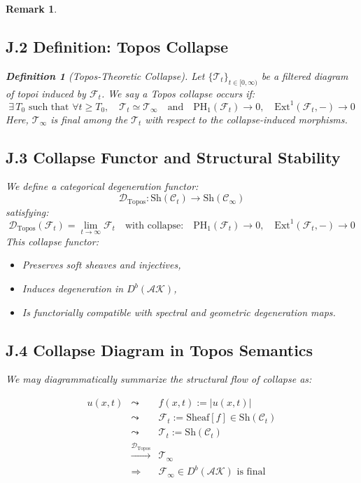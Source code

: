 \documentclass[11pt]{article}
\newtheorem{definition}[theorem]{Definition}
\newtheorem{remark}[theorem]{Remark}
\begin{document}
\begin{remark}
\subsection*{J.2 Definition: Topos Collapse}

\begin{definition}[Topos-Theoretic Collapse]
Let $\{\mathscr{T}_t\}_{t\in[0,\infty)}$ be a filtered diagram of topoi induced by $\mathcal{F}_t$.  
We say a \emph{Topos collapse} occurs if:
\[
\exists\, T_0 \text{ such that } \forall t \geq T_0,\quad \mathscr{T}_t \simeq \mathscr{T}_\infty
\quad \text{and} \quad \mathrm{PH}_1(\mathcal{F}_t) \to 0,\quad \mathrm{Ext}^1(\mathcal{F}_t, -) \to 0
\]
Here, $\mathscr{T}_\infty$ is final among the $\mathscr{T}_t$ with respect to the collapse-induced morphisms.
\end{definition}

\subsection*{J.3 Collapse Functor and Structural Stability}

We define a categorical degeneration functor:
\[
\mathcal{D}_\mathrm{Topos} : \mathrm{Sh}(\mathcal{C}_t) \longrightarrow \mathrm{Sh}(\mathcal{C}_\infty)
\]
satisfying:
\[
\mathcal{D}_\mathrm{Topos}(\mathcal{F}_t) = \lim_{t \to \infty} \mathcal{F}_t
\quad \text{with collapse:} \quad \mathrm{PH}_1(\mathcal{F}_t) \to 0,\quad \mathrm{Ext}^1(\mathcal{F}_t, -) \to 0
\]
This collapse functor:
\begin{itemize}
  \item Preserves soft sheaves and injectives,
  \item Induces degeneration in $D^b(\mathcal{AK})$,
  \item Is functorially compatible with spectral and geometric degeneration maps.
\end{itemize}

\subsection*{J.4 Collapse Diagram in Topos Semantics}

We may diagrammatically summarize the structural flow of collapse as:

\[
\begin{array}{rcl}
u(x,t) & \leadsto & f(x,t) := |u(x,t)| \\
& \leadsto & \mathcal{F}_t := \mathrm{Sheaf}[f] \in \mathrm{Sh}(\mathcal{C}_t) \\
& \leadsto & \mathscr{T}_t := \mathrm{Sh}(\mathcal{C}_t) \\
& \xrightarrow{\mathcal{D}_\mathrm{Topos}} & \mathscr{T}_\infty \\
& \Longrightarrow & \mathcal{F}_\infty \in D^b(\mathcal{AK}) \text{ is final}
\end{array}
\]


\end{remark}
\end{document}
